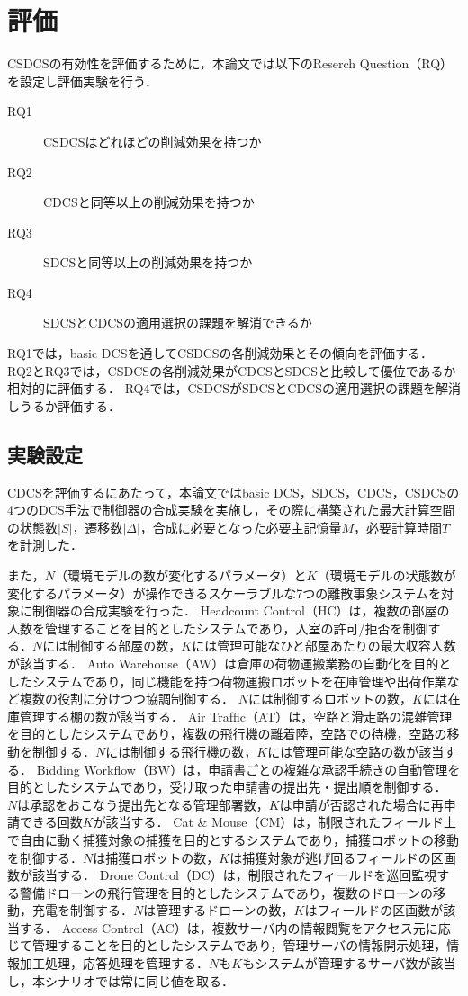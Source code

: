 \section{評価}
\label{section:evaluation}
CSDCSの有効性を評価するために，本論文では以下のReserch Question（RQ）を設定し評価実験を行う．

{
\begin{description}
  \item[RQ1] CSDCSはどれほどの削減効果を持つか
  \item[RQ2] CDCSと同等以上の削減効果を持つか
  \item[RQ3] SDCSと同等以上の削減効果を持つか
  \item[RQ4] SDCSとCDCSの適用選択の課題を解消できるか
\end{description}
}

RQ1では，basic DCSを通してCSDCSの各削減効果とその傾向を評価する．
RQ2とRQ3では，CSDCSの各削減効果がCDCSとSDCSと比較して優位であるか相対的に評価する．
RQ4では，CSDCSがSDCSとCDCSの適用選択の課題を解消しうるか評価する．

\subsection{実験設定}
CDCSを評価するにあたって，本論文ではbasic DCS，SDCS，CDCS，CSDCSの4つのDCS手法で制御器の合成実験を実施し，その際に構築された最大計算空間の状態数$|S|$，遷移数$|\Delta|$，合成に必要となった必要主記憶量$M$，必要計算時間$T$を計測した．

また，$N$（環境モデルの数が変化するパラメータ）と$K$（環境モデルの状態数が変化するパラメータ）が操作できるスケーラブルな7つの離散事象システムを対象に制御器の合成実験を行った．
Headcount Control（HC）\cite{paper:ArtGallery}は，複数の部屋の人数を管理することを目的としたシステムであり，入室の許可/拒否を制御する．$N$には制御する部屋の数，$K$には管理可能なひと部屋あたりの最大収容人数が該当する．
Auto Warehouse（AW）\cite{paper:KIVA_System}は倉庫の荷物運搬業務の自動化を目的としたシステムであり，同じ機能を持つ荷物運搬ロボットを在庫管理や出荷作業など複数の役割に分けつつ協調制御する．
$N$には制御するロボットの数，$K$には在庫管理する棚の数が該当する．
Air Trafﬁc（AT）は，空路と滑走路の混雑管理を目的としたシステムであり，複数の飛行機の離着陸，空路での待機，空路の移動を制御する．$N$には制御する飛行機の数，$K$には管理可能な空路の数が該当する．
Bidding Workflow（BW）は，申請書ごとの複雑な承認手続きの自動管理を目的としたシステムであり，受け取った申請書の提出先・提出順を制御する．
$N$は承認をおこなう提出先となる管理部署数，$K$は申請が否認された場合に再申請できる回数$K$が該当する．
Cat \& Mouse（CM）は，制限されたフィールド上で自由に動く捕獲対象の捕獲を目的とするシステムであり，捕獲ロボットの移動を制御する．$N$は捕獲ロボットの数，$K$は捕獲対象が逃げ回るフィールドの区画数が該当する．
Drone Control（DC）は，制限されたフィールドを巡回監視する警備ドローンの飛行管理を目的としたシステムであり，複数のドローンの移動，充電を制御する．$N$は管理するドローンの数，$K$はフィールドの区画数が該当する．
Access Control（AC）は，複数サーバ内の情報閲覧をアクセス元に応じて管理することを目的としたシステムであり，管理サーバの情報開示処理，情報加工処理，応答処理を管理する．$N$も$K$もシステムが管理するサーバ数が該当し，本シナリオでは常に同じ値を取る．

